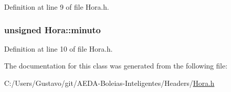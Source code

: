 Definition at line 9 of file Hora.\+h.

\hypertarget{class_hora_a9d33ce2d8a3f4b3d05b2a3c6df782fa4}{
\subsubsection[{minuto}]{\setlength{\rightskip}{0pt plus 5cm}unsigned Hora\+::minuto\hspace{0.3cm}{\ttfamily [private]}}}\label{class_hora_a9d33ce2d8a3f4b3d05b2a3c6df782fa4}


Definition at line 10 of file Hora.\+h.



The documentation for this class was generated from the following file\+:\begin{DoxyCompactItemize}
\item 
C\+:/\+Users/\+Gustavo/git/\+A\+E\+D\+A-\/\+Boleias-\/\+Inteligentes/\+Headers/\hyperlink{_hora_8h}{Hora.\+h}\end{DoxyCompactItemize}
